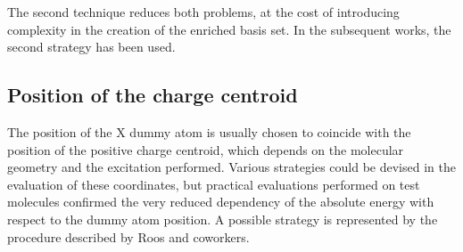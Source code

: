 The second technique reduces both problems, at the cost of introducing
complexity in the creation of the enriched basis set. In the subsequent
works, the second strategy has been used.



\subsection*{Position of the charge centroid}

The position of the X dummy atom is usually chosen to coincide with the position of
the positive charge centroid, which depends on the molecular geometry and
the excitation performed. Various strategies could be devised in the
evaluation of these coordinates, but practical evaluations performed on
test molecules confirmed the very reduced dependency of the absolute energy
with respect to the dummy atom position. A possible strategy is represented 
by the procedure described by Roos and coworkers\cite{roos-qmescca}.


